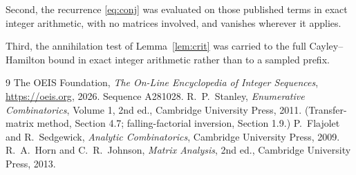 \documentclass[11pt,a4paper]{article}
\theoremstyle{plain}
\theoremstyle{definition}
\begin{document}
Second, the recurrence \eqref{eq:conj} was evaluated on those published terms in exact
integer arithmetic, with no matrices involved, and vanishes wherever it applies.

Third, the annihilation test of Lemma~\ref{lem:crit} was carried to the full
Cayley--Hamilton bound in exact integer arithmetic rather than to a sampled prefix.

\begin{thebibliography}{9}
 The OEIS Foundation, \emph{The On-Line Encyclopedia of Integer
Sequences}, \url{https://oeis.org}, 2026. Sequence A281028.
 R.~P.~Stanley, \emph{Enumerative Combinatorics}, Volume 1, 2nd ed.,
Cambridge University Press, 2011. (Transfer-matrix method, Section 4.7; falling-factorial
inversion, Section 1.9.)
 P.~Flajolet and R.~Sedgewick, \emph{Analytic Combinatorics}, Cambridge
University Press, 2009.
 R.~A.~Horn and C.~R.~Johnson, \emph{Matrix Analysis}, 2nd ed., Cambridge
University Press, 2013.
\end{thebibliography}
\end{document}
